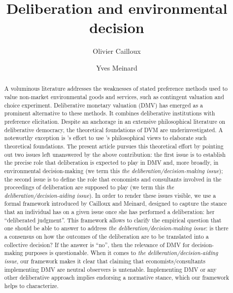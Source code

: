 \documentclass[version=3.21, pagesize, twoside=off, bibliography=totoc, DIV=calc, fontsize=12pt, a4paper, french, english]{scrartcl}
\newcommand{\institute}[1]{}
\newcommand{\keywords}[1]{}
\begin{document}
\title{Deliberation and environmental decision}
\author{Olivier Cailloux \and Yves Meinard}
\institute{
	Olivier Cailloux 
	\and
	Yves Meinard 
	\at 
	Université Paris-Dauphine, \\
	PSL Research University, \\
	CNRS, \\
	LAMSADE\\
	75016 PARIS, FRANCE\\
	\email{olivier.cailloux@dauphine.fr}
}
\makeatletter
\makeatother
\maketitle

\keywords{decision aid, justification, empirical validation, methodology}

\begin{abstract}
A voluminous literature addresses the weaknesses of stated preference methods used to value non-market environmental goods and services, such as contingent valuation and choice experiment. 
Deliberative monetary valuation (DMV) has emerged as a prominent alternative to these methods. It combines deliberative institutions with preference elicitation. 
Despite an anchorage in an extensive philosophical literature on deliberative democracy, the theoretical foundations of DVM are underinvestigated.  
A noteworthy exception is \citeauthor{bartkowski_beyond_2018}'s effort to use \citeauthor{sen_idea_2009}'s philosophical views to elaborate such theoretical foundations. 
The present article pursues this theoretical effort by pointing out two issues left unanswered by the above contribution: 
the first issue is to establish the precise role that deliberation is expected to play in DMV and, more broadly, in environmental decision-making (we term this \emph{the deliberation/decision-making issue}); 
the second issue is to define the role that economists and consultants involved in the proceedings of deliberation are supposed to play (we term this \emph{the deliberation/decision-aiding issue}). 
In order to render these issues visible, we use a formal framework introduced by Cailloux and Meinard, designed to capture the stance that an individual has on a given issue once she has performed a deliberation: her ``deliberated judgment''. 
This framework allows to clarify the empirical question that one should be able to answer to address \emph{the deliberation/decision-making issue}: is there a consensus on how the outcomes of the deliberation are to be translated into a collective decision? 
If the answer is ``no'', then the relevance of DMV for decision-making purposes is questionable. 
When it comes to \emph{the deliberation/decision-aiding issue}, our framework makes it clear that claiming that economists/consultants implementing DMV are neutral observers is untenable. 
Implementing DMV or any other deliberative approach implies endorsing a normative stance, which our framework helps to characterize.
\end{abstract}
\end{document}
